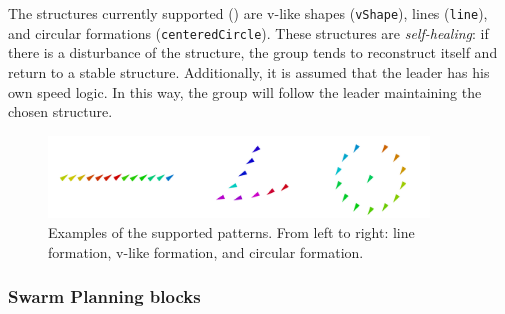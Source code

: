 The structures currently supported () are v-like shapes (\lstinline|vShape|), lines (\lstinline|line|), and circular formations (\lstinline|centeredCircle|). 
 These structures are \emph{self-healing}: if there is a disturbance 
 of the structure, 
 the group tends to reconstruct itself and return to a stable structure. 
Additionally, it is assumed that the leader has his own speed logic. 
 In this way,
 the group will follow the leader maintaining the chosen structure. 
\begin{figure}[t]
  \centering
  \includegraphics[width=0.9\textwidth]{papers/coordination2023-macro/images/shapes.png}
  \caption{Examples of the supported patterns. From left to right: 
   line formation, v-like formation, and
   circular formation.
  }
   \label{fig:formations}
\end{figure}
  
\subsubsection{Swarm Planning blocks}\label{subsec:planner} %

